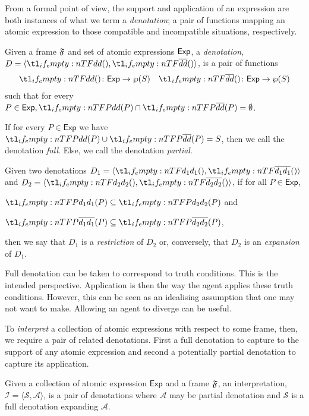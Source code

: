 \documentclass[10pt]{article}
\begin{document}
From a formal point of view, the support and application of an expression are both instances of what we term a \emph{denotation}; a pair of functions mapping an atomic expression to those compatible and incompatible situations, respectively.

\begin{definition}[Denotation]
  Given a frame \(\mathfrak{F}\) and set of atomic expressions \(\mathsf{Exp}\), a \emph{denotation}, \(D = \langle \cdeno{},\ideno{} \rangle\), is a pair of functions
  \begin{align*}
    \cdeno{} \colon \mathsf{Exp} \to \wp(S) & & \ideno{} \colon \mathsf{Exp} \to \wp(S)
  \end{align*}
  such that for every \(P \in \mathsf{Exp}, \cdeno{P} \cap \ideno{P} = \emptyset\).

  If for every \(P \in \mathsf{Exp}\) we have \(\cdeno{P} \cup \ideno{P} = S\), then we call the denotation \emph{full}.\newline
  Else, we call the denotation \emph{partial}.
\end{definition}

Given two denotations \(D_{1} = \langle \cdeno[d_{1}]{},\ideno[d_{1}]{} \rangle\) and \(D_{2} = \langle \cdeno[d_{2}]{},\ideno[d_{2}]{} \rangle\), if for all \(P \in \mathsf{Exp}\),
\begin{enumerate*}[label=]
\item \(\cdeno[d_{1}]{P} \subseteq \cdeno[d_{2}]{P}\) and
\item \(\ideno[d_{1}]{P} \subseteq \ideno[d_{2}]{P}\),
\end{enumerate*}
then we say that \(D_{1}\) is a \emph{restriction} of \(D_{2}\) or, conversely, that \(D_{2}\) is an \emph{expansion} of \(D_{1}\).

Full denotation can be taken to correspond to truth conditions.
This is the intended perspective.
Application is then the way the agent applies these truth conditions.
However, this can be seen as an idealising assumption that one may not want to make.
Allowing an agent to diverge can be useful.





To \emph{interpret} a collection of atomic expressions with respect to some frame, then, we require a pair of related denotations.
First a full denotation to capture to the support of any atomic expression and second a potentially partial denotation to capture its application.

\begin{definition}[Interpretation]
  Given a collection of atomic expression \(\mathsf{Exp}\) and a frame \(\mathfrak{F}\), an interpretation, \(\mathcal{I} = \langle \mathcal{S},\mathcal{A} \rangle\), is a pair of denotations where \(\mathcal{A}\) may be partial denotation and \(\mathcal{S}\) is a full denotation expanding \(\mathcal{A}\).
\end{definition}
\end{document}
